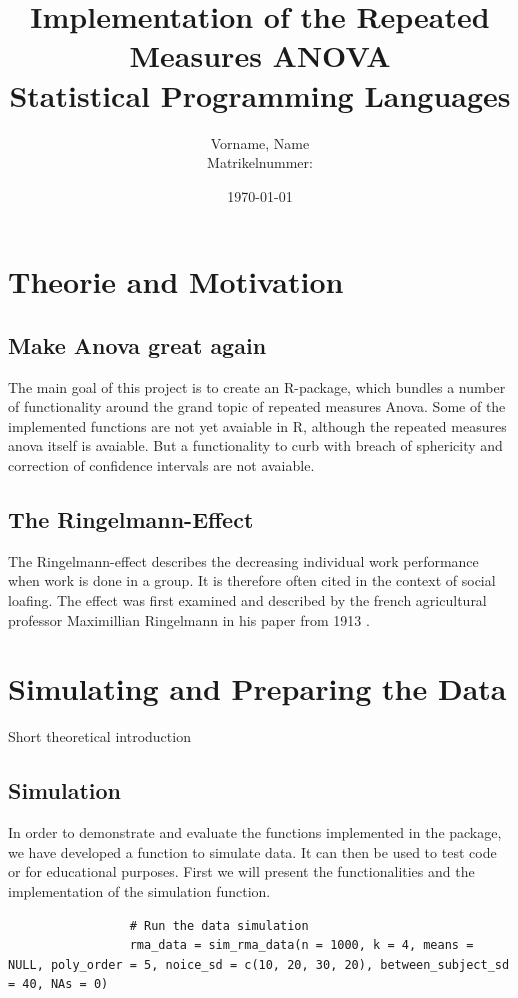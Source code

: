 \documentclass[11pt]{article}
\author{Vorname, Name\\Matrikelnummer: }
\title{\textbf{Implementation of the Repeated Measures ANOVA}\\ Statistical Programming Languages \\[5cm]}
\date{\today}
\begin{document}
	\maketitle
	\thispagestyle{fancy}
	\newpage
	\tableofcontents
	\newpage
	\section{Theorie and Motivation}
		\subsection{Make Anova great again}
		The main goal of this project is to create an R-package, which bundles a number of functionality around the grand topic of repeated measures Anova. Some of the implemented functions are not yet avaiable in R, although the repeated measures anova itself is avaiable. But a functionality to curb with breach of sphericity and correction of confidence intervals are not avaiable.
		
		
		\subsection{The Ringelmann-Effect}
		The Ringelmann-effect describes the decreasing individual work performance when work is done in a group. It is therefore often cited in the context of social loafing. The effect was first examined and described by the french agricultural professor Maximillian Ringelmann in his paper from 1913 \citep{ringelmann1913research}. 
	
	\section{Simulating and Preparing the Data}
	Short theoretical introduction
		\subsection{Simulation}
				 In order to demonstrate and evaluate the functions implemented in the package, we have developed a function to simulate data. It can then be used to test code or for educational purposes. First we will present the functionalities and the implementation of the simulation function.\\
				 
				 \begin{lstlisting}
				 # Run the data simulation
				 rma_data = sim_rma_data(n = 1000, k = 4, means = NULL, poly_order = 5, noice_sd = c(10, 20, 30, 20), between_subject_sd = 40, NAs = 0)
				 
				 \end{lstlisting}
				 
\end{document}
